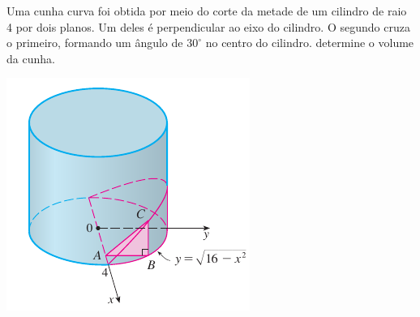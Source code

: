 \begin{frame}

\begin{exe}

Uma cunha curva foi obtida por meio do corte da metade de um cilindro de raio 4 por dois planos. Um deles é perpendicular ao eixo do cilindro. O segundo cruza o primeiro, formando um ângulo de $30^\circ$ no centro do cilindro. determine o volume da cunha.

\end{exe}


\begin{center}
\includegraphics[scale=.7]{figuras/cunha.png}
\end{center}

\end{frame}


